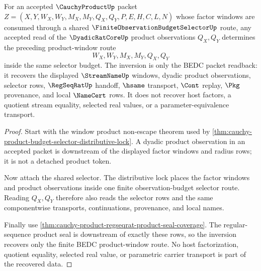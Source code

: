 \begin{theorem}
\label{thm:cauchy-product-dyadic-product-window-inversion}
For an accepted $\CauchyProductUp$ packet $Z=(X,Y,W_X,W_Y,M_X,M_Y,Q_X,Q_Y,P,E,H,C,L,N)$ whose factor windows are consumed through a shared $\FiniteObservationBudgetSelectorUp$ route, any accepted read of the $\DyadicRatCoreUp$ product observations $Q_X,Q_Y$ determines the preceding product-window route
$$
W_X,W_Y,M_X,M_Y,Q_X,Q_Y
$$
inside the same selector budget. The inversion is only the BEDC packet readback: it recovers the displayed $\StreamNameUp$ windows, dyadic product observations, selector rows, $\RegSeqRatUp$ handoff, $\hsame$ transport, $\Cont$ replay, $\Pkg$ provenance, and local $\NameCert$ rows. It does not recover host factors, a quotient stream equality, selected real values, or a parameter-equivalence transport.
\end{theorem}
\begin{proof}
Start with the window product non-escape theorem used by \autoref{thm:cauchy-product-budget-selector-distributive-lock}. A dyadic product observation in an accepted packet is downstream of the displayed factor windows and radius rows; it is not a detached product token.

Now attach the shared selector. The distributive lock places the factor windows and product observations inside one finite observation-budget selector route. Reading $Q_X,Q_Y$ therefore also reads the selector rows and the same componentwise transports, continuations, provenance, and local names.

Finally use \autoref{thm:cauchy-product-regseqrat-product-seal-coverage}. The regular-sequence product seal is downstream of exactly these rows, so the inversion recovers only the finite BEDC product-window route. No host factorization, quotient equality, selected real value, or parametric carrier transport is part of the recovered data.
\end{proof}

